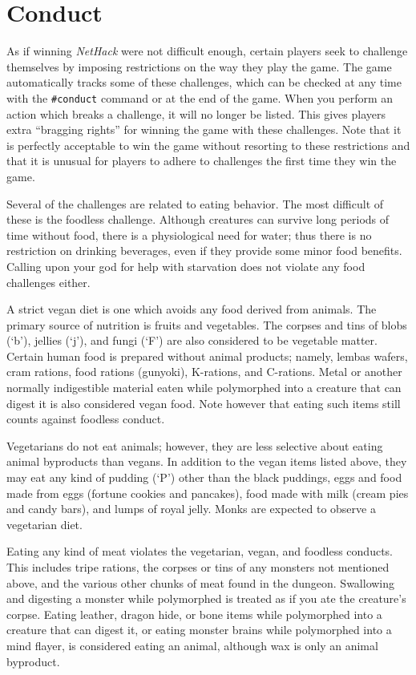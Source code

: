 \section{Conduct}

As if winning {\it NetHack\/} were not difficult enough, certain players
seek to challenge themselves by imposing restrictions on the
way they play the game.  The game automatically tracks some of
these challenges, which can be checked at any time with the {\tt \#conduct}
command or at the end of the game.  When you perform an action which
breaks a challenge, it will no longer be listed.  This gives
players extra ``bragging rights'' for winning the game with these
challenges.  Note that it is perfectly acceptable to win the game
without resorting to these restrictions and that it is unusual for
players to adhere to challenges the first time they win the game.

Several of the challenges are related to eating behavior.  The most
difficult of these is the foodless challenge.  Although creatures
can survive long periods of time without food, there is a physiological
need for water; thus there is no restriction on drinking beverages,
even if they provide some minor food benefits.
Calling upon your god for help with starvation does
not violate any food challenges either.

A strict vegan diet is one which avoids any food derived from animals.
The primary source of nutrition is fruits and vegetables.  The
corpses and tins of blobs (`b'), jellies (`j'), and fungi (`F') are
also considered to be vegetable matter.  Certain human
food is prepared without animal products; namely, lembas wafers, cram
rations, food rations (gunyoki), K-rations, and C-rations.
Metal or another normally indigestible material eaten while polymorphed
into a creature that can digest it is also considered vegan food.
Note however that eating such items still counts against foodless conduct.

Vegetarians do not eat animals;
however, they are less selective about eating animal byproducts than vegans.
In addition to the vegan items listed above, they may eat any kind
of pudding (`P') other than the black puddings,
eggs and food made from eggs (fortune cookies and pancakes),
food made with milk (cream pies and candy bars), and lumps of
royal jelly.  Monks are expected to observe a vegetarian diet.

Eating any kind of meat violates the vegetarian, vegan, and foodless
conducts.  This includes tripe rations, the corpses or tins of any
monsters not mentioned above, and the various other chunks of meat
found in the dungeon.  Swallowing and digesting a monster while polymorphed
is treated as if you ate the creature's corpse.
Eating leather, dragon hide, or bone items while
polymorphed into a creature that can digest it, or eating monster brains
while polymorphed into a mind flayer, is considered eating
an animal, although wax is only an animal byproduct.

